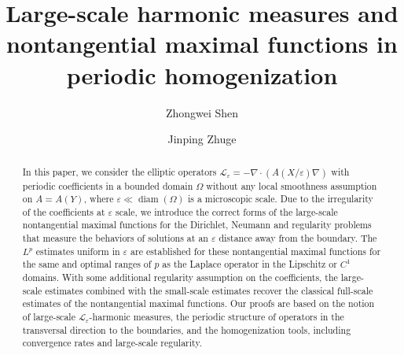 \documentclass[reqno,12pt]{amsart} %
\theoremstyle{definition}
\theoremstyle{remark}
\numberwithin{equation}{section}
\newcommand{\e}{\varepsilon}
\DeclareMathOperator{\diam}{diam}
\begin{document}
\title[Large-scale harmonic measures and nontangential maximal functions]{Large-scale harmonic measures and nontangential maximal functions in periodic homogenization}

\author{Zhongwei Shen}
\address{Zhongwei Shen: Institute for Theoretical Sciences, Westlake University, No. 600 Dunyu Road, Xihu District, Hangzhou,
Zhejiang 310030, P.R. China.}

\author{Jinping Zhuge}
\address{Jinping Zhuge: Morningside Center of Mathematics, Academy of Mathematics and systems science,
Chinese Academy of Sciences, Beijing 100190, China.}



\date{}

\begin{abstract}
    In this paper, we consider the elliptic operators $\mathcal{L}_\varepsilon = -\nabla\cdot (A(X/\e) \nabla )$ with periodic coefficients in a bounded domain $\Omega$ without any local smoothness assumption on $A = A(Y)$, where $\e \ll \diam(\Omega)$ is a microscopic scale. Due to the irregularity of the coefficients at $\varepsilon$ scale, we introduce the correct forms of the large-scale nontangential maximal functions for the Dirichlet, Neumann and regularity problems that measure the behaviors of solutions at an $\varepsilon$ distance away from the boundary. The $L^p$ estimates uniform in $\e$ are established for these nontangential maximal functions for the same and optimal ranges of $p$ as the Laplace operator in the Lipschitz or $C^1$ domains. With some additional regularity assumption on the coefficients, the large-scale estimates combined with the small-scale estimates recover the classical full-scale estimates of the nontangential maximal functions. Our proofs are based on the notion of large-scale $\mathcal{L}_\varepsilon$-harmonic measures, the periodic structure of operators in the transversal direction to the boundaries, and the homogenization tools, including convergence rates and large-scale regularity.
\end{abstract}

\maketitle

\end{document}
